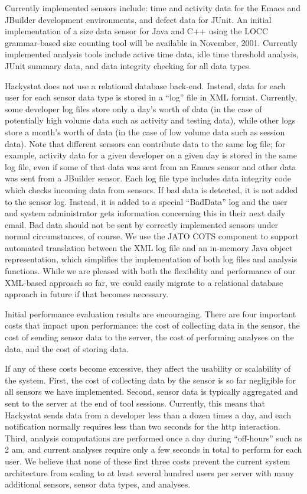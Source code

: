 Currently implemented sensors include: time and activity data for the Emacs
and JBuilder development environments, and defect data for JUnit.  An
initial implementation of a size data sensor for Java and C++ using the
LOCC grammar-based size counting tool will be available in November, 2001.
Currently implemented analysis tools include active time data, idle time
threshold analysis, JUnit summary data, and data integrity checking for all
data types.

Hackystat does not use a relational database back-end. Instead, data for
each user for each sensor data type is stored in a ``log'' file in XML
format.  Currently, some developer log files store only a day's worth of
data (in the case of potentially high volume data such as activity and
testing data), while other logs store a month's worth of data (in the case
of low volume data such as session data).  Note that different sensors can
contribute data to the same log file; for example, activity data for a
given developer on a given day is stored in the same log file, even if some
of that data was sent from an Emacs sensor and other data was sent from a
JBuilder sensor. Each log file type includes data integrity code which
checks incoming data from sensors.  If bad data is detected, it is not
added to the sensor log. Instead, it is added to a special ``BadData'' log
and the user and system administrator gets information concerning this in
their next daily email.  Bad data should not be sent by correctly
implemented sensors under normal circumstances, of course.  We use the JATO
COTS component to support automated translation between the XML log file
and an in-memory Java object representation, which simplifies the
implementation of both log files and analysis functions.  While we are
pleased with both the flexibility and performance of our XML-based approach
so far, we could easily migrate to a relational database approach in future
if that becomes necessary.

Initial performance evaluation results are encouraging. There are four
important costs that impact upon performance: the cost of collecting data
in the sensor, the cost of sending sensor data to the server, the cost of
performing analyses on the data, and the cost of storing data. 

If any of
these costs become excessive, they affect the usability or scalability of
the system. First, the cost of collecting data by the sensor is so far
negligible for all sensors we have implemented.  Second, sensor data is
typically aggregated and sent to the server at the end of tool sessions.
Currently, this means that Hackystat sends data from a developer less than
a dozen times a day, and each notification normally requires less than two
seconds for the http interaction.  Third, analysis computations are
performed once a day during ``off-hours'' such as 2 am, and current
analyses require only a few seconds in total to perform for each user.  We
believe that none of these first three costs prevent the current system
architecture from scaling to at least several hundred users per server with
many additional sensors, sensor data types, and analyses.  

